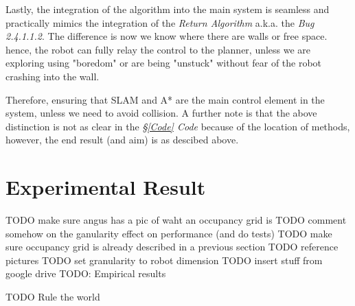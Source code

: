 \documentclass[11pt, a4paper]{article}
\begin{document}
Lastly, the integration of the algorithm into the main system is seamless and practically mimics the integration of the \textit{Return Algorithm}\cite{task2_report} a.k.a. the \textit{Bug 2.4.1.1.2}. The difference is now we know where there are walls or free space. hence, the robot can fully relay the control to the planner, unless we are exploring using "boredom"\cite{task2_report} or are being "unstuck"\cite{task2_report} without fear of the robot crashing into the wall. 

Therefore, ensuring that SLAM and A* are the main control element in the system, unless we need to avoid collision. A further note is that the above distinction is not as clear in the \textit{\S\ref{Code} Code} because of the location of methods, however, the end result (and aim) is as descibed above.


\section{Experimental Result}
\label{Experimental_Results}







TODO make sure angus has a pic of waht an occupancy grid is
TODO comment somehow on the ganularity effect on performance (and do tests)
TODO make sure occupancy grid is already described in a previous section
TODO reference pictures
TODO set granularity to robot dimension
TODO insert stuff from google drive
TODO: Empirical results


TODO Rule the world
\end{document}
